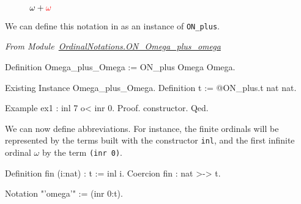 \begin{figure}[h]
   \centering
   \caption{\textcolor{blue}{$\omega+{\color{red}\omega}$}}
   \label{fig:omega-plus-omega}
 \end{figure}

We can define this notation in \coq{} as an instance of \texttt{ON\_plus}.


\vspace{4pt}
\noindent\emph{From Module~\href{../src/html/hydras.OrdinalNotations.ON_Omega_plus_omega.html}{OrdinalNotations.ON\_Omega\_plus\_omega}}

\begin{Coqsrc}
Definition Omega_plus_Omega := ON_plus Omega Omega.

Existing Instance Omega_plus_Omega.
Definition t := @ON_plus.t nat nat.
\end{Coqsrc}

\begin{Coqsrc}
Example ex1 : inl 7 o< inr 0.
Proof. constructor. Qed.
\end{Coqsrc}

We can now define abbreviations. For instance, the finite ordinals will be represented by the terms built with  the constructor \texttt{inl}, and the first infinite ordinal $\omega$ by the term \texttt{(inr 0)}.

\begin{Coqsrc}
Definition fin (i:nat) : t := inl i.
Coercion fin : nat >-> t.

Notation "'omega'" := (inr  0:t).
\end{Coqsrc}

